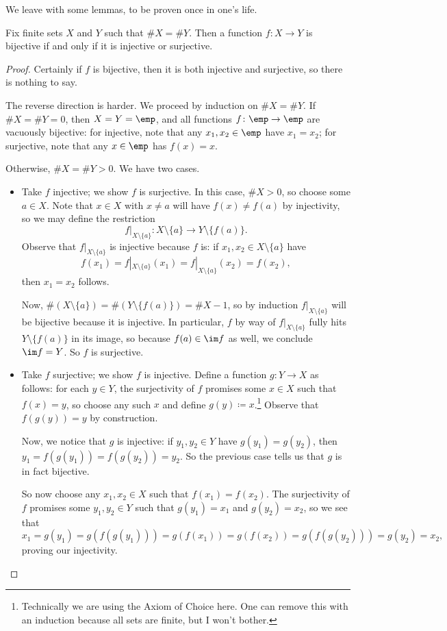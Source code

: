 We leave with some lemmas, to be proven once in one's life.
\begin{lemma}
	Fix finite sets $X$ and $Y$ such that $\#X=\#Y$. Then a function $f\colon X\to Y$ is bijective if and only if it is injective or surjective.
\end{lemma}
\begin{proof}
	Certainly if $f$ is bijective, then it is both injective and surjective, so there is nothing to say.
	
	The reverse direction is harder. We proceed by induction on $\#X=\#Y$. If $\#X=\#Y=0$, then $X=Y=\emp$, and all functions $f\colon\emp\to\emp$ are vacuously bijective: for injective, note that any $x_1,x_2\in\emp$ have $x_1=x_2$; for surjective, note that any $x\in\emp$ has $f(x)=x$.

	Otherwise, $\#X=\#Y>0$. We have two cases.
	\begin{itemize}
		\item Take $f$ injective; we show $f$ is surjective. In this case, $\#X>0$, so choose some $a\in X$. Note that $x\in X$ with $x\ne a$ will have $f(x)\ne f(a)$ by injectivity, so we may define the restriction
		\[f|_{X\setminus\{a\}}:X\setminus\{a\}\to Y\setminus\{f(a)\}.\]
		Observe that $f|_{X\setminus\{a\}}$ is injective because $f$ is: if $x_1,x_2\in X\setminus\{a\}$ have
		\[f(x_1)=f|_{X\setminus\{a\}}(x_1)=f|_{X\setminus\{a\}}(x_2)=f(x_2),\]
		then $x_1=x_2$ follows.
		
		Now, $\#(X\setminus\{a\})=\#(Y\setminus\{f(a)\})=\#X-1$, so by induction $f|_{X\setminus\{a\}}$ will be bijective because it is injective. In particular, $f$ by way of $f|_{X\setminus\{a\}}$ fully hits $Y\setminus\{f(a)\}$ in its image, so because $f(a)\in\im f$ as well, we conclude $\im f=Y$. So $f$ is surjective.

		\item Take $f$ surjective; we show $f$ is injective. Define a function $g\colon Y\to X$ as follows: for each $y\in Y$, the surjectivity of $f$ promises some $x\in X$ such that $f(x)=y$, so choose any such $x$ and define $g(y)\coloneqq x$.\footnote{Technically we are using the Axiom of Choice here. One can remove this with an induction because all sets are finite, but I won't bother.} Observe that $f(g(y))=y$ by construction.

		Now, we notice that $g$ is injective: if $y_1,y_2\in Y$ have $g(y_1)=g(y_2)$, then $y_1=f(g(y_1))=f(g(y_2))=y_2$. So the previous case tells us that $g$ is in fact bijective.

		So now choose any $x_1,x_2\in X$ such that $f(x_1)=f(x_2)$. The surjectivity of $f$ promises some $y_1,y_2\in Y$ such that $g(y_1)=x_1$ and $g(y_2)=x_2$, so we see that
		\[x_1=g(y_1)=g(f(g(y_1)))=g(f(x_1))=g(f(x_2))=g(f(g(y_2)))=g(y_2)=x_2,\]
		proving our injectivity.
		\qedhere
	\end{itemize}
\end{proof}
